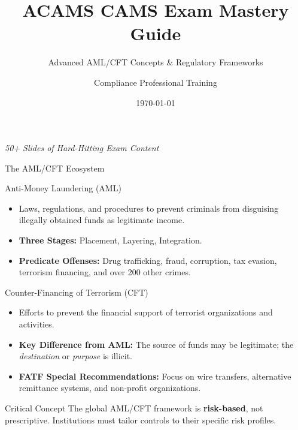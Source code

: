 \documentclass{beamer}
\title{ACAMS CAMS Exam Mastery Guide}
\subtitle{Advanced AML/CFT Concepts \& Regulatory Frameworks}
\author{Compliance Professional Training}
\date{\today}
\renewcommand{\small}{\fontsize{8}{10}\selectfont}
\begin{document}
	
	\begin{frame}
		\titlepage
		\begin{center}
			\small \textit{50+ Slides of Hard-Hitting Exam Content}
		\end{center}
	\end{frame}
	
	\begin{frame}{The AML/CFT Ecosystem}
		\begin{block}{Anti-Money Laundering (AML)}
			\begin{itemize}
				\item Laws, regulations, and procedures to prevent criminals from disguising illegally obtained funds as legitimate income.
				\item \textbf{Three Stages:} Placement, Layering, Integration.
				\item \textbf{Predicate Offenses:} Drug trafficking, fraud, corruption, tax evasion, terrorism financing, and over 200 other crimes.
			\end{itemize}
		\end{block}
		\begin{block}{Counter-Financing of Terrorism (CFT)}
			\begin{itemize}
				\item Efforts to prevent the financial support of terrorist organizations and activities.
				\item \textbf{Key Difference from AML:} The source of funds may be legitimate; the \textit{destination} or \textit{purpose} is illicit.
				\item \textbf{FATF Special Recommendations:} Focus on wire transfers, alternative remittance systems, and non-profit organizations.
			\end{itemize}
		\end{block}
		\begin{alertblock}{Critical Concept}
			The global AML/CFT framework is \textbf{risk-based}, not prescriptive. Institutions must tailor controls to their specific risk profiles.
		\end{alertblock}
	\end{frame}
	
\end{document}
